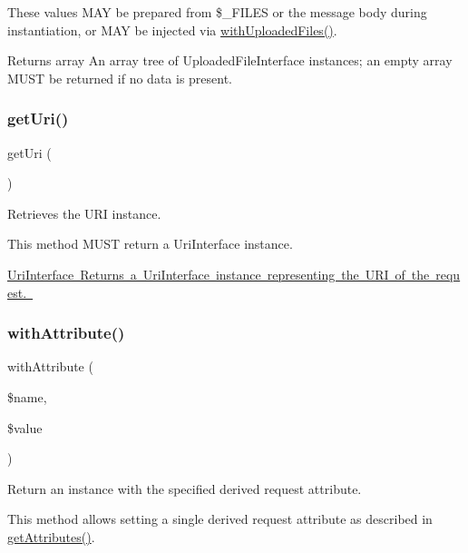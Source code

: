 These values M\+AY be prepared from \$\+\_\+\+F\+I\+L\+ES or the message body during instantiation, or M\+AY be injected via \mbox{\hyperlink{class_pes_1_1_http_1_1_request_a74e948aa5aa4eaccb08debcf9ff989b0}{with\+Uploaded\+Files()}}.

\begin{DoxyReturn}{Returns}
array An array tree of Uploaded\+File\+Interface instances; an empty array M\+U\+ST be returned if no data is present. 
\end{DoxyReturn}
\mbox{\label{class_pes_1_1_http_1_1_request_a2ac86cae38fbe15a019d075d485ab702}} 
\subsubsection{\texorpdfstring{get\+Uri()}{getUri()}}
{\footnotesize\ttfamily get\+Uri (\begin{DoxyParamCaption}{ }\end{DoxyParamCaption})}

Retrieves the U\+RI instance.

This method M\+U\+ST return a Uri\+Interface instance.

\mbox{\hyperlink{}{Uri\+Interface Returns a Uri\+Interface instance representing the U\+RI of the request. }}\mbox{\label{class_pes_1_1_http_1_1_request_a198860db2088101b62e531a1db45aa5b}} 
\subsubsection{\texorpdfstring{with\+Attribute()}{withAttribute()}}
{\footnotesize\ttfamily with\+Attribute (\begin{DoxyParamCaption}\item[{}]{\$name,  }\item[{}]{\$value }\end{DoxyParamCaption})}

Return an instance with the specified derived request attribute.

This method allows setting a single derived request attribute as described in \mbox{\hyperlink{class_pes_1_1_http_1_1_request_afbe85ec4b9947cc951c67d63911cf0a4}{get\+Attributes()}}.


